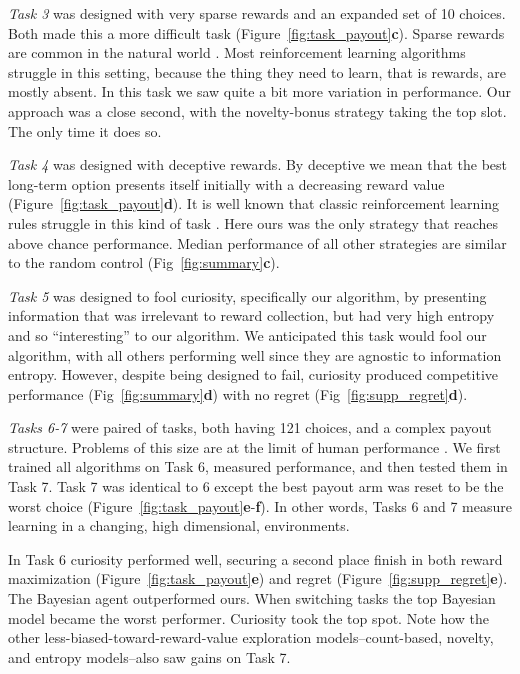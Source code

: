 \textit{Task 3} was designed with very sparse rewards \cite{Silver2016b,Silver2018} and an expanded set of 10 choices. Both made this a more difficult task (Figure~\ref{fig:task_payout}\textbf{c}). Sparse rewards are common in the natural world \cite{anderson1984optimal,westphal2006foraging}. Most reinforcement learning algorithms struggle in this setting, because the thing they need to learn, that is rewards, are mostly absent. In this task we saw quite a bit more variation in performance. Our approach was a close second, with the novelty-bonus strategy taking the top slot. The only time it does so.

\textit{Task 4} was designed with deceptive rewards. By deceptive we mean that the best long-term option presents itself initially with a decreasing reward value (Figure~\ref{fig:task_payout}\textbf{d}). It is well known that classic reinforcement learning rules struggle in this kind of task \cite{Lehman2011a,Sutton2018}. Here ours was the only strategy that reaches above chance performance. Median performance of all other strategies are similar to the random control (Fig~\ref{fig:summary}\textbf{c}). 

\textit{Task 5} was designed to fool curiosity, specifically our algorithm, by presenting information that was irrelevant to reward collection, but had very high entropy and so ``interesting'' to our algorithm. We anticipated this task would fool our algorithm, with all others performing well since they are agnostic to information entropy. However, despite being designed to fail,  curiosity produced competitive performance (Fig~\ref{fig:summary}\textbf{d}) with no regret (Fig~\ref{fig:supp_regret}\textbf{d}).

\textit{Tasks 6-7} were paired of tasks, both having 121 choices, and a complex payout structure. Problems of this size are at the limit of human performance \cite{Wu2018}. We first trained all algorithms on Task 6, measured performance, and then tested them in Task 7. Task 7 was identical to 6 except the best payout arm was reset to be the worst choice (Figure~\ref{fig:task_payout}\textbf{e}-\textbf{f}). In other words, Tasks 6 and 7 measure learning in a changing, high dimensional, environments.

In Task 6 curiosity performed well, securing a second place finish in both reward maximization (Figure~\ref{fig:task_payout}\textbf{e}) and regret (Figure~\ref{fig:supp_regret}\textbf{e}). The Bayesian agent outperformed ours. When switching tasks the top Bayesian model became the worst  performer. Curiosity took the top spot. Note how the other less-biased-toward-reward-value exploration models--count-based, novelty, and entropy models--also saw gains on Task 7.



